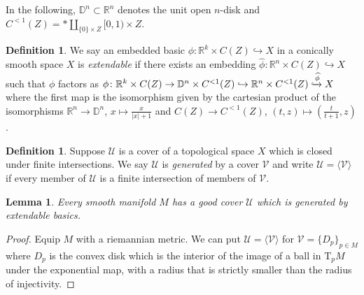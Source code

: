 \documentclass[]{amsart}
\newcommand{\mcal}[1]{\mathcal{#1}}
\newcommand{\mbb}[1]{\mathbb{#1}}
\newcommand{\R}{\mbb{R}}
\newcommand{\Tangent}{\mathrm{T}}
\numberwithin{equation}{section}
\theoremstyle{definition}
\newtheorem{definition}[equation]{Definition}%
\theoremstyle{remark}
\theoremstyle{plain}
\newtheorem{lemma}[equation]{Lemma}
\begin{document}
In the following, $\mbb{D}^n\subset\R^n$ denotes the unit open $n$-disk and $C^{<1}(Z)=\ast\amalg_{\{0\}\times Z}[0,1)\times Z$.

\begin{definition}
    We say an embedded basic $\phi\colon \R^k\times C(Z)\hookrightarrow X$ in a conically smooth space $X$ is \emph{extendable} if there exists an embedding $\widehat{\phi}\colon\R^n\times C(Z)\hookrightarrow X$ such that $\phi$ factors as $\phi\colon\R^{k}\times C(Z)\to \mbb{D}^n\times C^{<1}(Z)\hookrightarrow \R^n\times C^{<1}(Z)\xhookrightarrow{\widehat{\phi}}X$ where the first map is the isomorphism given by the cartesian product of the isomorphisms $\R^n\to\mbb{D}^n$, $x\mapsto \frac{x}{|x|+1}$ and $C(Z)\to C^{<1}(Z)$, $(t,z)\mapsto (\frac{t}{t+1},z)$. 
\end{definition}

\begin{definition}
    Suppose $\mcal{U}$ is a cover of a topological space $X$ which is closed under finite intersections. We say $\mcal{U}$ is \emph{generated} by a cover $\mcal{V}$ and write $\mcal{U}=\langle\mcal{V}\rangle$ if every member of $\mcal{U}$ is a finite intersection of members of $\mcal{V}$.
\end{definition}

\begin{lemma}\label{2978BNV}
    Every smooth manifold $M$ has a good cover $\mcal{U}$ which is generated by extendable basics.
\end{lemma}
\begin{proof}
    Equip $M$ with a riemannian metric. We can put $\mcal{U}=\langle\mcal{V}\rangle$ for $\mcal{V}=\{D_p\}_{p\in M}$ where $D_p$ is the convex disk which is the interior of the image of a ball in $\Tangent_p M$ under the exponential map, with a radius that is strictly smaller than the radius of injectivity.
\end{proof}
\end{document}
